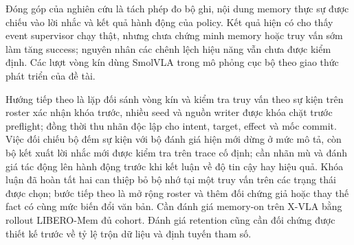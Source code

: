 Đóng góp của nghiên cứu là tách phép đo bộ ghi, nội dung memory thực sự được chiếu vào lời nhắc và kết quả hành động của policy. Kết quả hiện có cho thấy event supervisor chạy thật, nhưng chưa chứng minh memory hoặc truy vấn sớm làm tăng success; nguyên nhân các chênh lệch hiệu năng vẫn chưa được kiểm định. Các lượt vòng kín dùng SmolVLA trong mô phỏng cục bộ theo giao thức phát triển của đề tài.

Hướng tiếp theo là lặp đối sánh vòng kín và kiểm tra truy vấn theo sự kiện trên roster xác nhận khóa trước, nhiều seed và nguồn writer được khóa chặt trước preflight; đồng thời thu nhãn độc lập cho intent, target, effect và mốc commit. Việc đối chiếu bộ đếm sự kiện với bộ đánh giá hiện mới dừng ở mức mô tả, còn bộ kết xuất lời nhắc mới được kiểm tra trên trace cố định; cần nhãn mù và đánh giá tác động lên hành động trước khi kết luận về độ tin cậy hay hiệu quả. Khóa luận đã hoàn tất hai can thiệp bỏ bộ nhớ tại một truy vấn trên các trạng thái được chọn; bước tiếp theo là mở rộng roster và thêm đối chứng giả hoặc thay thế fact có cùng mức biến đổi văn bản. Cần đánh giá memory-on trên X-VLA bằng rollout LIBERO-Mem đủ cohort. Đánh giá retention cũng cần đối chứng được thiết kế trước về tỷ lệ trộn dữ liệu và định tuyến tham số.
